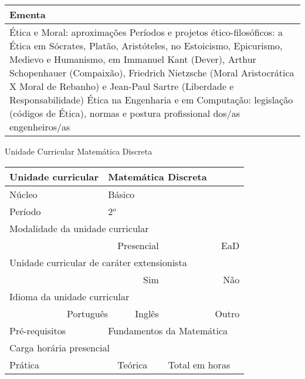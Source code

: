 \begin{quadro}[ht!]
\begin{tabular}{|p{3cm} p{2cm} p{3cm} p{2cm} p{3cm} p{2cm}|}
\multicolumn{6}{|p{15cm}|}{\cellcolor{blue1} Ementa} \\\hline
\hline\multicolumn{6}{|p{15cm}|}{\scriptsize Ética e Moral: aproximações Períodos e projetos ético-filosóficos: a Ética em Sócrates, Platão, Aristóteles, no Estoicismo, Epicurismo, Medievo e Humanismo, em Immanuel Kant (Dever), Arthur Schopenhauer (Compaixão), Friedrich Nietzsche (Moral Aristocrática X Moral de Rebanho) e Jean-Paul Sartre (Liberdade e Responsabilidade) Ética na Engenharia e em Computação: legislação (códigos de Ética), normas e postura profissional dos/as engenheiros/as}\\\hline
\hline
	\end{tabular}
\end{quadro}
\begin{quadro}[ht!]
  \centering\scriptsize
\caption{Unidade Curricular Matemática Discreta}
\label{ unit_11 }
\begin{tabular}{|p{3cm} p{2cm} p{3cm} p{2cm} p{3cm} p{2cm}|}\hline
\multicolumn{1}{|p{3cm}|}{\cellcolor{blue1} Unidade curricular} & \multicolumn{5}{p{9cm}|}{ Matemática Discreta }\\\hline
\multicolumn{1}{|p{3cm}|}{\cellcolor{blue1} Núcleo} & \multicolumn{5}{p{11.5cm}|}{ Básico }\\\hline
\multicolumn{1}{|p{3cm}|}{\cellcolor{blue1} Período} & \multicolumn{5}{p{9cm}|}{ 2$^o$ }\\\hline
\multicolumn{6}{|p{15cm}|}{\cellcolor{blue1} Modalidade da unidade curricular} \\\hline
\multicolumn{2}{|r}{		} &  \multicolumn{2}{r}{Presencial \XBox } & \multicolumn{2}{r|}{EaD \Square	} \\\hline
\multicolumn{6}{|p{15cm}|}{\cellcolor{blue1} Unidade curricular de caráter extensionista} \\\hline
\multicolumn{4}{|r}{			Sim \Square	} & \multicolumn{2}{r|}{	Não \XBox	}\\\hline
\multicolumn{6}{|p{15cm}|}{\cellcolor{blue1} Idioma da unidade curricular} \\ \hline
\multicolumn{2}{|r}{	Português \XBox	} &  \multicolumn{2}{r}{	Inglês \Square	} & \multicolumn{2}{r|}{	Outro \Square	} \\ \hline
\multicolumn{1}{|p{3cm}|}{\cellcolor{blue1} Pré-requisitos} & \multicolumn{5}{p{9cm}|}{ Fundamentos da Matemática }\\ \hline
\multicolumn{6}{|p{15cm}|}{\cellcolor{blue1} Carga horária presencial} \\ \hline
\multicolumn{1}{|p{3cm}|}{\raggedleft Prática} & \multicolumn{1}{p{1cm}|}{\centering	30	} &  \multicolumn{1}{p{3cm}|}{\raggedleft Teórica}  & \multicolumn{1}{p{1cm}|}{\centering 	30 } & \multicolumn{1}{p{3cm}|}{\raggedleft Total em horas} & \multicolumn{1}{p{1cm}|}{\raggedleft	60	} \\ \hline

\end{tabular}
\end{quadro}
